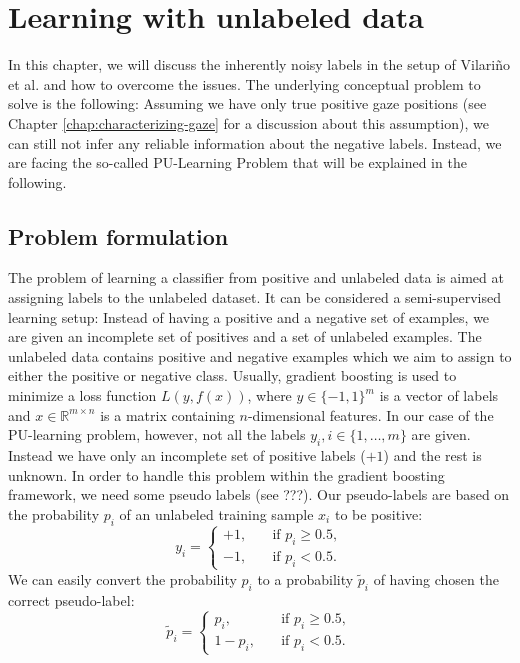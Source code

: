 \chapter{Learning with unlabeled data}
\label{chap:learning-with-unlabeled-data}
In this chapter, we will discuss the inherently noisy labels in the setup of Vilari\~no et al. and how to overcome the issues. 
The underlying conceptual problem to solve is the following: Assuming we have only true positive gaze positions (see Chapter \ref{chap:characterizing-gaze} for a discussion about this assumption), we can still not infer any reliable information about the negative labels. Instead, we are facing the so-called PU-Learning Problem that will be explained in the following.

\section{Problem formulation}
The problem of learning a classifier from positive and unlabeled data is aimed at assigning labels to the unlabeled dataset. 
It can be considered a semi-supervised learning setup: Instead of having a positive and a negative set of examples, we are given an incomplete set of positives and a set of unlabeled examples. 
The unlabeled data contains positive and negative examples which we aim to assign to either the positive or negative class. 
Usually, gradient boosting is used to minimize a loss function $L(y,f(x))$, where $y \in \{-1,1\}^m$ is a vector of labels and $x \in \mathbb{R}^{m\times n}$ is a matrix containing $n$-dimensional features. In our case of the PU-learning problem, however, not all the labels $y_i, i \in \{1,\dots,m\}$ are given. 
Instead we have only an incomplete set of positive labels ($+1$) and the rest is unknown. In order to handle this problem within the gradient boosting framework, we need some pseudo labels (see ???). Our pseudo-labels are based on the probability $p_i$ of an unlabeled training sample $x_i$ to be positive:
\begin{equation*}
 y_i = 
    \begin{cases}
	+1, \quad & \text{if } p_i \geq 0.5, \\
	-1, \quad & \text{if } p_i < 0.5.
      \end{cases}
\end{equation*}
We can easily convert the probability $p_i$ to a probability $\tilde p_i$ of having chosen the correct pseudo-label:
\begin{equation*}
 \tilde p_i = 
    \begin{cases}
	p_i, \quad & \text{if } p_i \geq 0.5, \\
	1-p_i, \quad & \text{if } p_i < 0.5.
      \end{cases}
\end{equation*}

